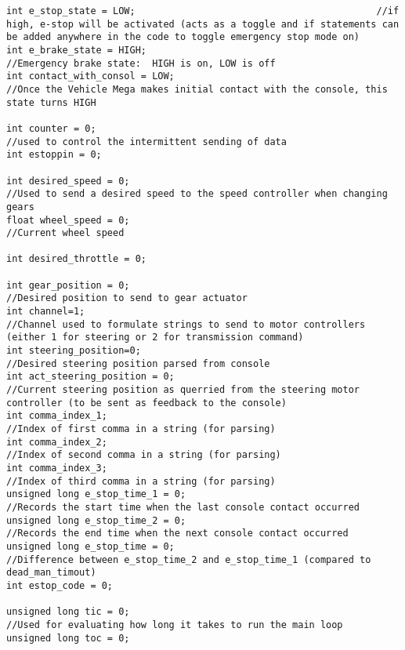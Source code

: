 \begin{lstlisting}[breaklines=true,basicstyle=\tiny]
int e_stop_state = LOW;                                           //if high, e-stop will be activated (acts as a toggle and if statements can be added anywhere in the code to toggle emergency stop mode on)
int e_brake_state = HIGH;                                         //Emergency brake state:  HIGH is on, LOW is off
int contact_with_consol = LOW;                                    //Once the Vehicle Mega makes initial contact with the console, this state turns HIGH 

int counter = 0;                                                  //used to control the intermittent sending of data
int estoppin = 0;

int desired_speed = 0;                                            //Used to send a desired speed to the speed controller when changing gears                          
float wheel_speed = 0;                                              //Current wheel speed

int desired_throttle = 0;

int gear_position = 0;                                            //Desired position to send to gear actuator
int channel=1;                                                    //Channel used to formulate strings to send to motor controllers (either 1 for steering or 2 for transmission command)
int steering_position=0;                                          //Desired steering position parsed from console
int act_steering_position = 0;                                    //Current steering position as querried from the steering motor controller (to be sent as feedback to the console)                                      
int comma_index_1;                                                //Index of first comma in a string (for parsing)
int comma_index_2;                                                //Index of second comma in a string (for parsing)
int comma_index_3;                                                //Index of third comma in a string (for parsing)
unsigned long e_stop_time_1 = 0;                                  //Records the start time when the last console contact occurred
unsigned long e_stop_time_2 = 0;                                  //Records the end time when the next console contact occurred
unsigned long e_stop_time = 0;                                    //Difference between e_stop_time_2 and e_stop_time_1 (compared to dead_man_timout)
int estop_code = 0;

unsigned long tic = 0;                                                //Used for evaluating how long it takes to run the main loop
unsigned long toc = 0;


\end{lstlisting}
